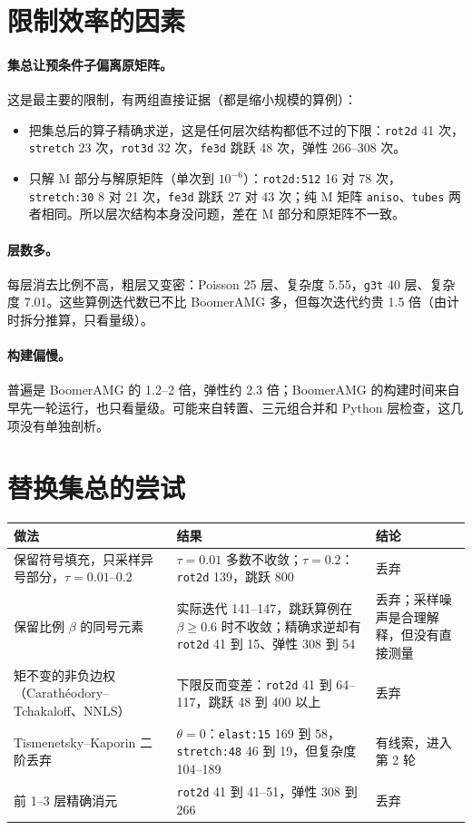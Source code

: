 \documentclass[11pt,a4paper]{ctexart}
\begin{document}
\section{限制效率的因素}
\paragraph{集总让预条件子偏离原矩阵。}这是最主要的限制，有两组直接证据（都是缩小规模的算例）：
\begin{itemize}
\item 把集总后的算子精确求逆，这是任何层次结构都低不过的下限：\texttt{rot2d} 41 次，\texttt{stretch} 23 次，\texttt{rot3d} 32 次，\texttt{fe3d} 跳跃 48 次，弹性 266--308 次。
\item 只解 M 部分与解原矩阵（单次到 $10^{-6}$）：\texttt{rot2d:512} 16 对 78 次，\texttt{stretch:30} 8 对 21 次，\texttt{fe3d} 跳跃 27 对 43 次；纯 M 矩阵 \texttt{aniso}、\texttt{tubes} 两者相同。所以层次结构本身没问题，差在 M 部分和原矩阵不一致。
\end{itemize}
\paragraph{层数多。}每层消去比例不高，粗层又变密：Poisson 25 层、复杂度 5.55，\texttt{g3t} 40 层、复杂度 7.01。这些算例迭代数已不比 BoomerAMG 多，但每次迭代约贵 1.5 倍（由计时拆分推算，只看量级）。
\paragraph{构建偏慢。}普遍是 BoomerAMG 的 1.2--2 倍，弹性约 2.3 倍；BoomerAMG 的构建时间来自早先一轮运行，也只看量级。可能来自转置、三元组合并和 Python 层检查，这几项没有单独剖析。

\section{替换集总的尝试}
\begin{table}[H]
\centering\footnotesize
\begin{tabular}{p{5.2cm}p{7.0cm}p{2.8cm}}
\toprule
做法 & 结果 & 结论 \\
\midrule
保留符号填充，只采样异号部分，$\tau=0.01$--$0.2$ & $\tau=0.01$ 多数不收敛；$\tau=0.2$：\texttt{rot2d} 139，跳跃 800 & 丢弃 \\
保留比例 $\beta$ 的同号元素 & 实际迭代 141--147，跳跃算例在 $\beta\ge0.6$ 时不收敛；精确求逆却有 \texttt{rot2d} 41 到 15、弹性 308 到 54 & 丢弃；采样噪声是合理解释，但没有直接测量 \\
矩不变的非负边权（Carathéodory--Tchakaloff、NNLS） & 下限反而变差：\texttt{rot2d} 41 到 64--117，跳跃 48 到 400 以上 & 丢弃 \\
Tismenetsky--Kaporin 二阶丢弃 & $\theta=0$：\texttt{elast:15} 169 到 58，\texttt{stretch:48} 46 到 19，但复杂度 104--189 & 有线索，进入第 2 轮 \\
前 1--3 层精确消元 & \texttt{rot2d} 41 到 41--51，弹性 308 到 266 & 丢弃 \\
\bottomrule
\end{tabular}
\end{table}
\end{document}
